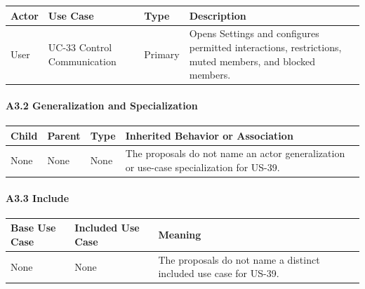 \documentclass[12pt]{article}
\renewcommand{\baselinestretch}{1.5}
\begin{document}
\begingroup
\small
\renewcommand{\baselinestretch}{1.0}\selectfont
\renewcommand{\arraystretch}{1.15}
\setlength{\tabcolsep}{6pt}
\begin{longtable}{|>{\raggedright\arraybackslash}p{}|>{\raggedright\arraybackslash}p{}|>{\raggedright\arraybackslash}p{}|>{\raggedright\arraybackslash}p{}|}
\hline
\textbf{Actor} & \textbf{Use Case} & \textbf{Type} & \textbf{Description} \\ \hline
\endhead
User & UC-33 Control Communication & Primary & Opens Settings and configures permitted interactions, restrictions, muted members, and blocked members. \\ \hline
\end{longtable}
\endgroup
\par\medskip

\hypertarget{sec:a3-2-generalization-and-specialization}{}
\paragraph*{A3.2 Generalization and Specialization}
\par\medskip

\begingroup
\small
\renewcommand{\baselinestretch}{1.0}\selectfont
\renewcommand{\arraystretch}{1.15}
\setlength{\tabcolsep}{6pt}
\begin{longtable}{|>{\raggedright\arraybackslash}p{}|>{\raggedright\arraybackslash}p{}|>{\raggedright\arraybackslash}p{}|>{\raggedright\arraybackslash}p{}|}
\hline
\textbf{Child} & \textbf{Parent} & \textbf{Type} & \textbf{Inherited Behavior or Association} \\ \hline
\endhead
None & None & None & The proposals do not name an actor generalization or use-case specialization for US-39. \\ \hline
\end{longtable}
\endgroup
\par\medskip

\hypertarget{sec:a3-3-include}{}
\paragraph*{A3.3 Include}
\par\medskip

\begingroup
\small
\renewcommand{\baselinestretch}{1.0}\selectfont
\renewcommand{\arraystretch}{1.15}
\setlength{\tabcolsep}{6pt}
\begin{longtable}{|>{\raggedright\arraybackslash}p{}|>{\raggedright\arraybackslash}p{}|>{\raggedright\arraybackslash}p{}|}
\hline
\textbf{Base Use Case} & \textbf{Included Use Case} & \textbf{Meaning} \\ \hline
\endhead
None & None & The proposals do not name a distinct included use case for US-39. \\ \hline
\end{longtable}
\endgroup
\par\medskip
\end{document}
